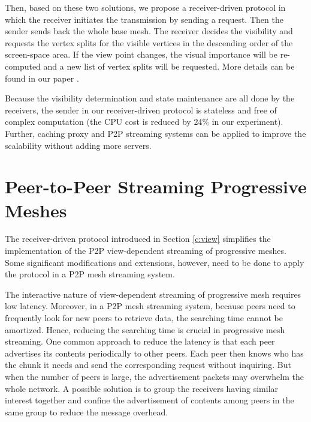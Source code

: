 \documentclass{sig-alt-release2}
\begin{document}
    Then, based on these two solutions, we propose a receiver-driven protocol in which 
    the receiver initiates the transmission by sending a request. Then the sender sends back
    the whole base mesh. The receiver decides the visibility and requests the vertex splits for 
    the visible vertices in the descending order of the 
    screen-space area. If the view point changes, the visual importance will
    be re-computed and a new list of vertex splits will be requested. More details can be found
    in our paper \cite{Cheng2008}.
    
    Because the visibility determination and state maintenance are all done by the receivers, 
    the sender in our receiver-driven protocol is stateless and free of complex computation
    (the CPU cost is reduced by $24\%$ in our experiment). 
    Further, caching proxy and P2P streaming systems can be applied to improve
    the scalability without adding more servers.  
   
\section{Peer-to-Peer Streaming Progressive Meshes}
\label{c:p2p}
    The receiver-driven protocol introduced in Section \ref{c:view} simplifies the 
    implementation of the P2P view-dependent streaming of progressive meshes.
    Some significant modifications and extensions, however, need to be done to apply the 
    protocol in a P2P mesh streaming system.
    
    The interactive nature of view-dependent streaming of progressive mesh requires
    low latency. Moreover, in a P2P mesh streaming system, because peers 
    need to frequently look for new peers to retrieve data, the searching time
    cannot be amortized. Hence, reducing the searching time is crucial in progressive
    mesh streaming. One common approach to reduce the latency
    is that each peer advertises its contents periodically
    to other peers. Each peer then knows
    who has the chunk it needs and send the corresponding request without inquiring.
    But when the number of peers is large,
    the advertisement packets may overwhelm the whole network. 
    A possible solution is to group the receivers having similar interest together and
    confine the advertisement of contents among peers in the same group to reduce the message
    overhead. 
    
\end{document}
